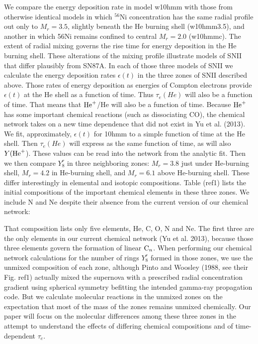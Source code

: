 \documentclass[manuscript]{aastex}
\newcommand{\cenn}{{\rm C}_n}
\newcommand{\hep}{{\rm He}^+}
\begin{document}
We compare the energy deposition rate in model w10hmm with those from 
otherwise identical models in which $^{56}$Ni concentration has the same 
radial profile out only to $M_r=3.5$, slightly beneath the He burning shell 
(w10hmm3.5), and another in which 56Ni remains confined to central 
$M_r=2.0$ (w10hmmc). The extent of radial mixing governs the rise time 
for energy deposition in the He burning shell. These alterations of 
the mixing profile illustrate models of SNII that differ plausibly from 
SN87A. In each of those three models of SNII we calculate the energy 
deposition rates $\epsilon(t)$ in the three zones of SNII described above. 
Those rates of energy deposition as energies of Compton electrons provide 
$\epsilon(t)$ at the He shell as a function of time. Thus 
$\tau_e(He)$ will also be a 
function of time. That means that $\hep$/He will also be a function of time. 
Because $\hep$ has some important chemical reactions (such as dissociating CO), 
the chemical network takes on a new time dependence that did not exist in 
Yu et al. (2013). We fit, approximately, $\epsilon(t)$ for 10hmm to a simple 
function of time at the He shell. Then $\tau_e(He)$ will express as the same 
function of time, as will also $Y(\hep$). These values can be read into the 
network from the analytic fit. Then we then compare $Y_8^r$ in three 
neighboring 
zones: $M_r=3.8$ just under He-burning shell, $M_r=4.2$ in He-burning shell, 
and $M_r=6.1$ above He-burning shell. These differ interestingly in 
elemental and isotopic compositions. Table (ref1) lists the initial 
compositions of the important chemical elements in these three zones. 
We include N and Ne despite their absence from the current version of our 
chemical network:

That composition lists only five elements, He, C, O, N and Ne. The first 
three are the only elements in our current chemical network 
(Yu et al. 2013), because those three elements govern the formation of 
linear $\cenn$. When performing our chemical network calculations for the 
number of rings $Y_8^r$ formed in those zones, we use the unmixed composition 
of each zone, although Pinto and Woosley (1988, see their Fig. ref1) 
actually mixed the supernova with a prescribed radial concentration 
gradient using spherical symmetry befitting the intended gamma-ray 
propagation code. But we calculate molecular reactions in the unmixed zones 
on the expectation that most of the mass of the zones remains unmixed 
chemically. Our paper will focus on the molecular differences among these 
three zones in the attempt to understand the effects of differing chemical 
compositions and of time-dependent $\tau_e$. 
\end{document}

